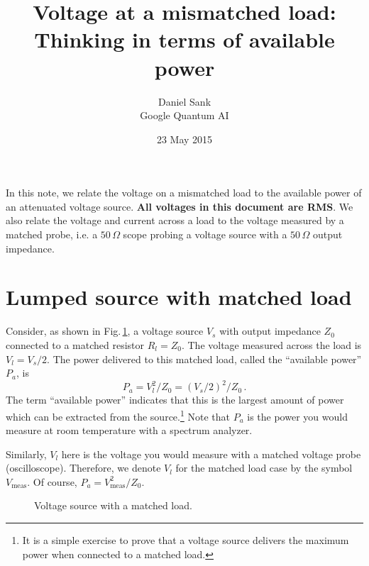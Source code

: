 \documentclass[twocolumn]{article}
\title{Voltage at a mismatched load:\\
Thinking in terms of available power}
\author{Daniel Sank \\
\small Google Quantum AI}
\date{23 May 2015}
\begin{document}
\maketitle

In this note, we relate the voltage on a mismatched load to the available power of an attenuated voltage source.
\textbf{All voltages in this document are RMS}.
We also relate the voltage and current across a load to the voltage measured by a matched probe, i.e. a $50\,\Omega$ scope probing a voltage source with a $50\,\Omega$ output impedance.

\section{Lumped source with matched load}

Consider, as shown in Fig.\,\ref{fig:lumped_matched_load}, a voltage source $V_s$ with output impedance $Z_0$ connected to a matched resistor $R_l=Z_0$.
The voltage measured across the load is $V_l = V_s/2$.
The power delivered to this matched load, called the ``available power'' $P_a$, is
\begin{equation}
P_a = V_l^2 / Z_0 = (V_s/2)^2 / Z_0 \, .
\end{equation}
The term ``available power'' indicates that this is the largest amount of power which can be extracted from the source.\footnote{It is a simple exercise to prove that a voltage source delivers the maximum power when connected to a matched load.}
Note that $P_a$ is the power you would measure at room temperature with a spectrum analyzer.

Similarly, $V_l$ here is the voltage you would measure with a matched voltage probe (oscilloscope).
Therefore, we denote $V_l$ for the matched load case by the symbol $V_{\text{meas}}$.
Of course, $P_a = V_{\text{meas}}^2 / Z_0$.

\begin{figure}
\begin{centering}
\par\end{centering}
\caption{Voltage source with a matched load.}
\label{fig:lumped_matched_load}
\end{figure}
\end{document}
